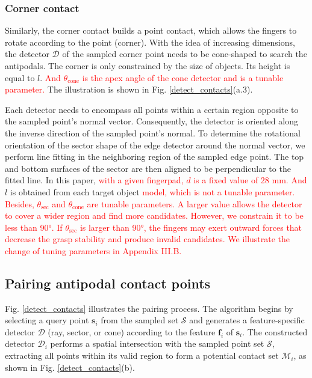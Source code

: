 \documentclass[journal]{IEEEtran}
\newcommand{\rev}[1]{\textcolor{red}{#1}}
\begin{document}
\subsubsection{Corner contact}
Similarly, the corner contact builds a point contact, which allows the fingers to rotate according to the point (corner). With the idea of increasing dimensions, the detector \( \mathcal{D} \) of the sampled corner point needs to be cone-shaped to search the antipodals. The corner is only constrained by the size of objects. Its height is equal to $l$. \rev{And $\theta_\mathrm{cone}$ is the apex angle of the cone detector and is a tunable parameter.} The illustration is shown in Fig. \ref{detect_contacts}(a.3).

Each detector needs to encompass all points within a certain region opposite to the sampled point's normal vector. Consequently, the detector is oriented along the inverse direction of the sampled point's normal. To determine the rotational orientation of the sector shape of the edge detector around the normal vector, we perform line fitting in the neighboring region of the sampled edge point. The top and bottom surfaces of the sector are then aligned to be perpendicular to the fitted line. In this paper, \rev{with a given fingerpad, $d$ is a fixed value of 28 mm. And} $l$ is obtained from each target object \rev{model, which is not a tunable parameter. Besides, $\theta_\mathrm{sec}$ and $\theta_\mathrm{cone}$ are tunable parameters. A larger value allows the detector to cover a wider region and find more candidates. However, we constrain it to be less than 90°. If $\theta_\mathrm{sec}$ is larger than 90°, the fingers may exert outward forces that decrease the grasp stability and produce invalid candidates. We illustrate the change of tuning parameters in Appendix III.B.}


\subsection{Pairing antipodal contact points}
Fig. \ref{detect_contacts} illustrates the pairing process. The algorithm begins by selecting a query point $\mathbf{s}_i$ from the sampled set  $\mathcal{S}$ and generates a feature-specific detector $\mathcal{D}$ (ray, sector, or cone) according to the feature $\mathbf{f}_i$ of $\mathbf{s}_i$.
The constructed detector $\mathcal{D}_i$ performs a spatial intersection with the sampled point set $\mathcal{S}$, extracting all points within its valid region to form a potential contact set $\mathcal{M}_i$, as shown in Fig. \ref{detect_contacts}(b). 
\end{document}
